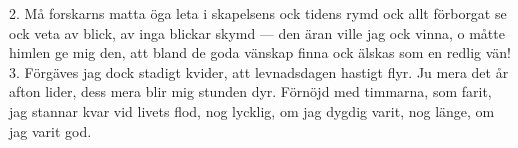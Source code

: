 2.  Må forskarns matta öga leta
    i skapelsens ock tidens rymd
    ock allt förborgat se ock veta
    av blick, av inga blickar skymd —
    den äran ville jag ock vinna,
    o måtte himlen ge mig den,
    att bland de goda vänskap finna
    ock älskas som en redlig vän!
3.  Förgäves jag dock stadigt kvider,
    att levnadsdagen hastigt flyr.
    Ju mera det år afton lider,
    dess mera blir mig stunden dyr.
    Förnöjd med timmarna, som farit,
    jag stannar kvar vid livets flod,
    nog lycklig, om jag dygdig varit,
    nog länge, om jag varit god.
